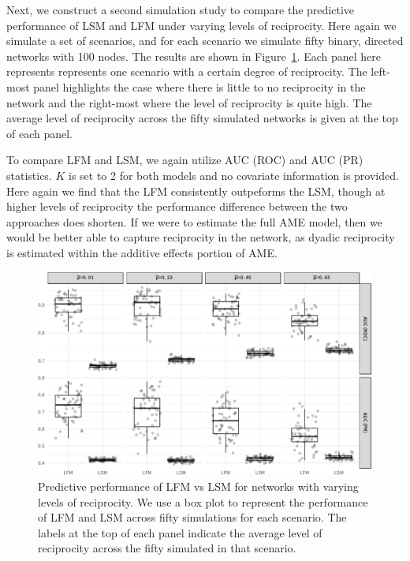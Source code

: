 \documentclass[12pt,pdflatex]{elsarticle}
\begin{document}
Next, we construct a second simulation study to compare the predictive performance of LSM and LFM under varying levels of reciprocity. Here again we simulate a set of scenarios, and for each scenario we simulate fifty binary, directed networks with 100 nodes. The results are shown in Figure~\ref{fig:sim_recip}. Each panel here represents represents one scenario with a certain degree of reciprocity. The left-most panel highlights the case where there is little to no reciprocity in the network and the right-most where the level of reciprocity is quite high. The average level of reciprocity across the fifty simulated networks is given at the top of each panel. 

To compare LFM and LSM, we again utilize AUC (ROC) and AUC (PR) statistics. $K$ is set to 2 for both models and no covariate information is provided. Here again we find that the LFM consistently outpeforms the LSM, though at higher levels of reciprocity the performance difference between the two approaches does shorten. If we were to estimate the full AME model, then we would be better able to capture reciprocity in the network, as dyadic reciprocity is estimated within the additive effects portion of AME. 

\begin{figure}[ht]
	\centering
	\includegraphics[width=1\textwidth]{sim2Viz.pdf}
	\caption{Predictive performance of LFM vs LSM for networks with varying levels of reciprocity. We use a box plot to represent the performance of LFM and LSM across fifty simulations for each scenario. The labels at the top of each panel indicate the average level of reciprocity across the fifty simulated in that scenario.}
	\label{fig:sim_recip}		
\end{figure}

\clearpage
% 

\newpage
\end{document}
